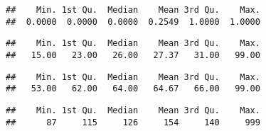 \documentclass[
]{article}
\newenvironment{Shaded}{\begin{snugshade}}{\end{snugshade}}
\newcommand{\FunctionTok}[1]{\textcolor[rgb]{0.13,0.29,0.53}{\textbf{#1}}}
\newcommand{\NormalTok}[1]{#1}
\newcommand{\OtherTok}[1]{\textcolor[rgb]{0.56,0.35,0.01}{#1}}
\newcommand{\SpecialCharTok}[1]{\textcolor[rgb]{0.81,0.36,0.00}{\textbf{#1}}}
\begin{document}
\begin{verbatim}
##    Min. 1st Qu.  Median    Mean 3rd Qu.    Max. 
##  0.0000  0.0000  0.0000  0.2549  1.0000  1.0000
\end{verbatim}

\begin{Shaded}
\end{Shaded}

\begin{verbatim}
##    Min. 1st Qu.  Median    Mean 3rd Qu.    Max. 
##   15.00   23.00   26.00   27.37   31.00   99.00
\end{verbatim}

\begin{Shaded}
\end{Shaded}

\begin{verbatim}
##    Min. 1st Qu.  Median    Mean 3rd Qu.    Max. 
##   53.00   62.00   64.00   64.67   66.00   99.00
\end{verbatim}

\begin{Shaded}
\end{Shaded}

\begin{verbatim}
##    Min. 1st Qu.  Median    Mean 3rd Qu.    Max. 
##      87     115     126     154     140     999
\end{verbatim}

\begin{Shaded}
\end{Shaded}
\end{document}

